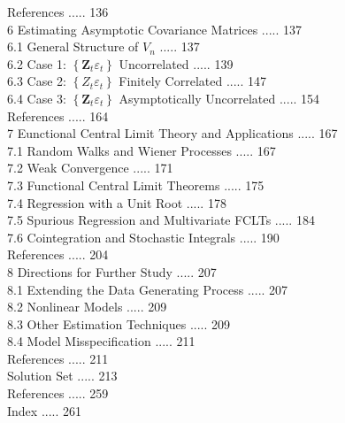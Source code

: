 \documentclass[10pt]{article}
\begin{document}
References ..... 136\\
6 Estimating Asymptotic Covariance Matrices ..... 137\\
6.1 General Structure of $V_{n}$ ..... 137\\
6.2 Case 1: $\left\{\boldsymbol{Z}_{t} \varepsilon_{t}\right\}$ Uncorrelated ..... 139\\
6.3 Case 2: $\left\{Z_{t} \varepsilon_{t}\right\}$ Finitely Correlated ..... 147\\
6.4 Case 3: $\left\{\boldsymbol{Z}_{t} \varepsilon_{t}\right\}$ Asymptotically Uncorrelated ..... 154\\
References ..... 164\\
7 Eunctional Central Limit Theory and Applications ..... 167\\
7.1 Random Walks and Wiener Processes ..... 167\\
7.2 Weak Convergence ..... 171\\
7.3 Functional Central Limit Theorems ..... 175\\
7.4 Regression with a Unit Root ..... 178\\
7.5 Spurious Regression and Multivariate FCLTs ..... 184\\
7.6 Cointegration and Stochastic Integrals ..... 190\\
References ..... 204\\
8 Directions for Further Study ..... 207\\
8.1 Extending the Data Generating Process ..... 207\\
8.2 Nonlinear Models ..... 209\\
8.3 Other Estimation Techniques ..... 209\\
8.4 Model Misspecification ..... 211\\
References ..... 211\\
Solution Set ..... 213\\
References ..... 259\\
Index ..... 261
\end{document}
